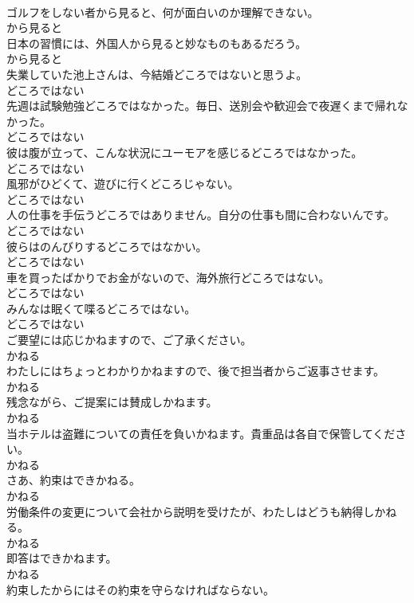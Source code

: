 \documentclass[8pt]{extreport}
\begin{document}
\begin{CJK}{UTF8}{min}
\\	ゴルフをしない者から見ると、何が面白いのか理解できない。	
\\	から見ると	
\\	日本の習慣には、外国人から見ると妙なものもあるだろう。	
\\	から見ると	
\\	失業していた池上さんは、今結婚どころではないと思うよ。	
\\	どころではない	
\\	先週は試験勉強どころではなかった。毎日、送別会や歓迎会で夜遅くまで帰れなかった。	
\\	どころではない	
\\	彼は腹が立って、こんな状況にユーモアを感じるどころではなかった。	
\\	どころではない	
\\	風邪がひどくて、遊びに行くどころじゃない。	
\\	どころではない	
\\	人の仕事を手伝うどころではありません。自分の仕事も間に合わないんです。	
\\	どころではない	
\\	彼らはのんびりするどころではなかい。	
\\	どころではない	
\\	車を買ったばかりでお金がないので、海外旅行どころではない。	
\\	どころではない	
\\	みんなは眠くて喋るどころではない。	
\\	どころではない	
\\	ご要望には応じかねますので、ご了承ください。	
\\	かねる	
\\	わたしにはちょっとわかりかねますので、後で担当者からご返事させます。	
\\	かねる	
\\	残念ながら、ご提案には賛成しかねます。	
\\	かねる	
\\	当ホテルは盗難についての責任を負いかねます。貴重品は各自で保管してください。	
\\	かねる	
\\	さあ、約束はできかねる。	
\\	かねる	
\\	労働条件の変更について会社から説明を受けたが、わたしはどうも納得しかねる。	
\\	かねる	
\\	即答はできかねます。	
\\	かねる	
\\	約束したからにはその約束を守らなければならない。	

\end{CJK}
\end{document}
